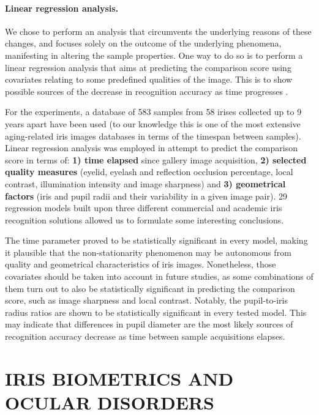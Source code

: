 \documentclass[a4paper,twoside]{article}
\begin{document}
\paragraph{Linear regression analysis.}
We chose to perform an analysis that circumvents the underlying reasons of these changes, and focuses solely on the outcome of the underlying phenomena, manifesting in altering the sample properties. One way to do so is to perform a linear regression analysis that aims at predicting the comparison score using covariates relating to some predefined qualities of the image. This is to show possible sources of the decrease in recognition accuracy as time progresses \cite{TrokielewiczAgingIWBF2015}. 

For the experiments, a database of 583 samples from 58 irises collected up to 9 years apart have been used (to our knowledge this is one of the most extensive aging-related iris images databases in terms of the timespan between samples). Linear regression analysis was employed in attempt to predict the comparison score in terms of: \textbf{1) time elapsed} since gallery image acquisition, \textbf{2) selected quality measures} (eyelid, eyelash and reflection occlusion percentage, local contrast, illumination intensity and image sharpness) and \textbf{3) geometrical factors} (iris and pupil radii and their variability in a given image pair). 29 regression models built upon three different commercial and academic iris recognition solutions allowed us to formulate some interesting conclusions.

The time parameter proved to be statistically significant in every model, making it plausible that the non-stationarity phenomenon may be autonomous from quality and geometrical characteristics of iris images. Nonetheless, those covariates should be taken into account in future studies, as some combinations of them turn out to also be statistically significant in predicting the comparison score, such as image sharpness and local contrast. Notably, the pupil-to-iris radius ratios are shown to be statistically significant in every tested model. This may indicate that differences in pupil diameter are the most likely sources of recognition accuracy decrease as time between sample acquisitions elapses.

\section{\uppercase{Iris biometrics and ocular disorders}}
\label{sec:Disease}
\end{document}

